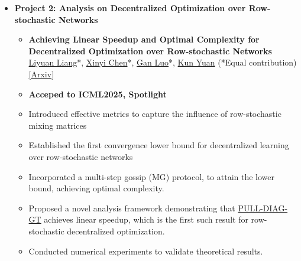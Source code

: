 \begin{itemize}
\begin{itemize}
              \item \textbf{Project 2: Analysis on Decentralized
Optimization over Row-stochastic Networks}
              \begin{itemize}
              \item \textbf{Achieving Linear Speedup and Optimal Complexity for Decentralized Optimization over Row-stochastic Networks}\\
              \href{https://lavaei.ieor.berkeley.edu/Group.html}{Liyuan Liang}*, \href{https://openreview.net/profile?id=~Xinyi_Chen9}{Xinyi Chen}*, \underline{Gan Luo}*, \href{https://kunyuan827.github.io}{Kun Yuan} (*Equal contribution) \href{https://arxiv.org/pdf/2506.04600}{[Arxiv]}
                  \item {\textbf{Acceped to ICML2025, Spotlight}}
                  \item {Introduced effective metrics to capture the influence of row-stochastic mixing matrices}
                  \item {Established the first convergence lower bound for decentralized learning over row-stochastic networks}
                  \item {Incorporated a multi-step gossip (MG) protocol, to attain the lower bound, achieving optimal complexity.}
                  \item {Proposed a novel analysis framework demonstrating that \href{https://arxiv.org/pdf/1803.09169}{PULL-DIAG-GT} achieves linear speedup, which is the first such result for row-stochastic decentralized optimization.}
                  \item{Conducted numerical experiments to validate theoretical results.}
              \end{itemize}
          \end{itemize}


\end{itemize}
